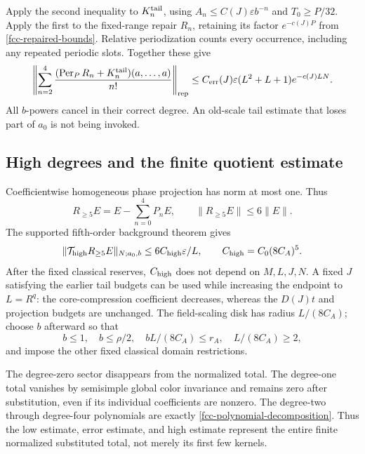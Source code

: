 \documentclass[11pt]{article}
\theoremstyle{remark}
\begin{document}
Apply the second inequality to \(K_n^{\rm tail}\),
using \(A_n\le C(J)\varepsilon b^{-n}\) and
\(T_0\ge P/32\). Apply the first to the fixed-range
repair \(R_n\), retaining its factor \(e^{-c(J)P}\)
from \eqref{fcc-repaired-bounds}. Relative periodization
counts every occurrence, including any repeated
periodic slots. Together these give
\begin{equation}
 \left\|\sum_{n=2}^4
    \frac{(\operatorname{Per}_P R_n+K_n^{\rm tail})
                         (a,\ldots,a)}{n!}\right\|_{\rm rep}
 \le C_{\rm err}(J)\varepsilon
              (L^2+L+1)e^{-c(J)LN}.
 \label{fcc-error-estimate}
\end{equation}
All \(b\)-powers cancel in their correct degree.
An old-scale tail estimate that loses part of
\(a_0\) is not being invoked.

\subsection{High degrees and the finite quotient estimate}
\label{fcc-contraction-section}

Coefficientwise homogeneous phase projection has norm
at most one. Thus
\begin{equation}
 R_{\ge5}E=E-\sum_{n=0}^4P_nE,\qquad
 \|R_{\ge5}E\|\le6\|E\|.
 \label{fcc-high-projection}
\end{equation}
The supported fifth-order background theorem gives
\begin{equation}
 \|\mathcal T_{\rm high}R_{\ge5}E\|_{N;a_0,b}
        \le6C_{\rm high}\varepsilon/L,
 \qquad C_{\rm high}=C_0(8C_A)^5.
 \label{fcc-high-estimate}
\end{equation}
After the fixed classical reserves, \(C_{\rm high}\)
does not depend on \(M,L,J,N\). A fixed \(J\) satisfying
the earlier tail budgets can be used while increasing
the endpoint to \(L=R^q\): the core-compression
coefficient decreases, whereas the \(D(J)t\) and
projection budgets are unchanged. The field-scaling
disk has radius \(L/(8C_A)\); choose \(b\) afterward
so that
\begin{equation}
 b\le1,\quad b\le\rho/2,\quad
 bL/(8C_A)\le r_A,\quad L/(8C_A)\ge2,
 \label{fcc-radius}
\end{equation}
and impose the other fixed classical domain
restrictions.

The degree-zero sector disappears from the normalized
total. The degree-one total vanishes by semisimple
global color invariance and remains zero after
substitution, even if its individual coefficients
are nonzero. The degree-two through degree-four
polynomials are exactly
\eqref{fcc-polynomial-decomposition}. Thus the low
estimate, error estimate, and high estimate represent
the entire finite normalized substituted total,
not merely its first few kernels.
\end{document}
